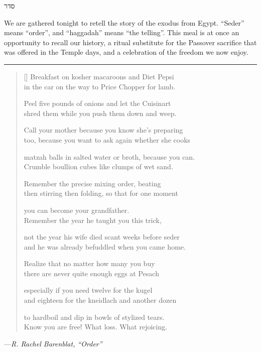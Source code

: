 \documentclass[a4paper,12pt,openany]{memoir}
\newcommand{\HgSource}[1]{\hfill{\small---\itshape{#1}}}
\newcommand{\hchapter}[1]{
  \begin{hebrew}
    \begin{Spacing}{.97}
      \newpage
      \strut

      \vspace{.15em}

      \noindent\Huge #1

      \vspace{1em}
    \end{Spacing}
  \end{hebrew}
}
\newcommand{\HgFill}{\vfill \hrule \vfill}
\begin{document}
\vfill

\hchapter{סדר}

We are gathered tonight to retell the story of the exodus from Egypt. ``Seder''
means ``order'', and ``haggadah'' means ``the telling''. This meal is at once an
opportunity to recall our history, a ritual substitute for the Passover
sacrifice that was offered in the Temple days, and a celebration of the freedom
we now enjoy.

\HgFill

\settowidth{\versewidth}{matzah balls in salted water or broth, because you can.}
\begin{verse}[\versewidth]
  Breakfast on kosher macaroons and Diet Pepsi\\
  in the car on the way to Price Chopper for lamb.

  Peel five pounds of onions and let the Cuisinart\\
  shred them while you push them down and weep.

  Call your mother because you know she’s preparing\\
  too, because you want to ask again whether she cooks

  matzah balls in salted water or broth, because you can.\\
  Crumble boullion cubes like clumps of wet sand.

  Remember the precise mixing order, beating \\
  then stirring then folding, so that for one moment

  you can become your grandfather. \\
  Remember the year he taught you this trick,

  not the year his wife died scant weeks before seder\\
  and he was already befuddled when you came home.

  Realize that no matter how many you buy\\
  there are never quite enough eggs at Pesach

  especially if you need twelve for the kugel \\
  and  eighteen for the kneidlach and another dozen

  to hardboil and dip in bowls of stylized tears.\\
  Know you are free! What loss. What rejoicing.
\end{verse}

\HgSource{R. Rachel Barenblat, ``Order''}
\newpage
\end{document}
